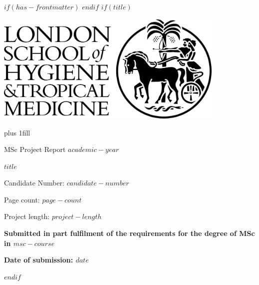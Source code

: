 $if(has-frontmatter)$
\frontmatter
$endif$
$if(title)$
\cleardoublepage
\thispagestyle{empty}
\begin{flushright}
\includegraphics[width=11cm]{img/lshtm_logo_small.jpg}
\end{flushright}
{\centering
\hbox{}\vskip 0cm plus 1fill
{\Large MSc Project Report $academic-year$ \par}
\vspace{6ex}
{\Huge\bfseries $title$ \par}
\vspace{6ex}
{\Large Candidate Number: $candidate-number$ \par}
\vspace{12ex}
{\small Page count:  $page-count$ \par}
\vspace{3ex}
{\small Project length: $project-length$ \par}
\vspace{6ex}
{\bfseries\large Submitted in part fulfilment of the requirements for the degree of MSc in $msc-course$ \par}
\vspace{3ex}
{\bfseries\large Date of submission:  $date$ \par}
\vspace{12ex}
}
$endif$
\let\mainmatterreal\mainmatter
\let\mainmatter\relax

